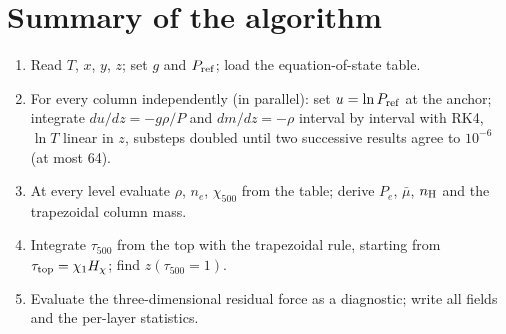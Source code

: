 \adjointcolumntrue


\section{Summary of the algorithm}
\begin{enumerate}
\item Read $T$, $x$, $y$, $z$; set $g$ and $P_{\rm ref}$; load the equation-of-state table.
\item For every column independently (in parallel): set $u=\ln P_{\rm ref}$ at the anchor; integrate $du/dz=-g\rho/P$ and
$dm/dz=-\rho$ interval by interval with RK4, $\ln T$ linear in $z$, substeps doubled until two successive results agree
to $10^{-6}$ (at most 64).
\item At every level evaluate $\rho$, $n_e$, $\chi_{500}$ from the table; derive $P_e$, $\bar\mu$, $n_{\rm H}$ and the
trapezoidal column mass.
\item Integrate $\tau_{500}$ from the top with the trapezoidal rule, starting from $\tau_{\rm top}=\chi_1H_\chi$; find
$z(\tau_{500}=1)$.
\item Evaluate the three-dimensional residual force as a diagnostic; write all fields and the per-layer statistics.
\end{enumerate}

